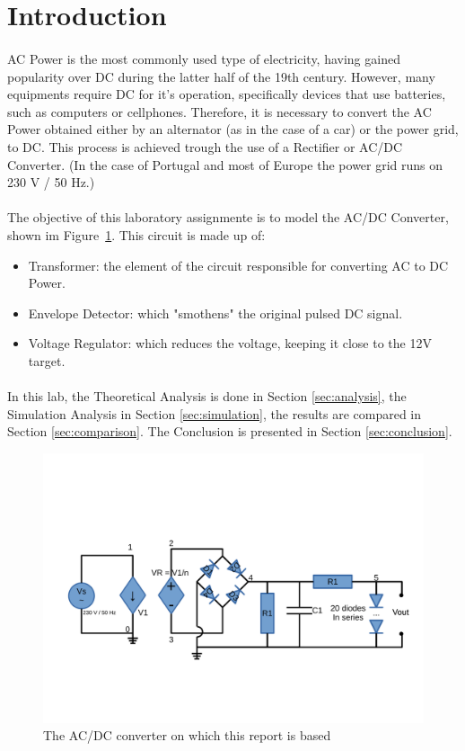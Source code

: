\section{Introduction}
\label{sec:introduction}


\paragraph{} AC Power is the most commonly used type of electricity, having gained popularity over DC during the latter half of the 19th century. However, many equipments require DC for it's operation, 
specifically devices that use batteries, such as computers or cellphones. Therefore, it is necessary to convert the AC Power obtained either by an alternator (as in the case of a car) or the power grid, to DC.
This process is achieved trough the use of a Rectifier or AC/DC Converter. (In the case of Portugal and most of Europe the power grid runs on 230 V / 50 Hz.)

\paragraph{} The objective of this laboratory assignmente is to model the AC/DC Converter, shown im Figure~\ref{fig:cir}. This circuit is made up of:

\begin{itemize}
	\item Transformer: the element of the circuit responsible for converting AC to DC Power.
	\item Envelope Detector: which "smothens" the original pulsed DC signal.
	\item Voltage Regulator: which reduces the voltage, keeping it close to the 12V target.
\end{itemize}

\paragraph{} In this lab, the Theoretical Analysis is done in Section \ref{sec:analysis}, the Simulation Analysis in Section \ref{sec:simulation}, the results are compared in Section \ref{sec:comparison}. The
Conclusion is presented in Section \ref{sec:conclusion}.

\begin{figure}[h] \centering
\includegraphics[width=0.7\linewidth]{./cir.pdf}
\caption{The AC/DC converter on which this report is based}
\label{fig:cir}
\end{figure}

\clearpage
